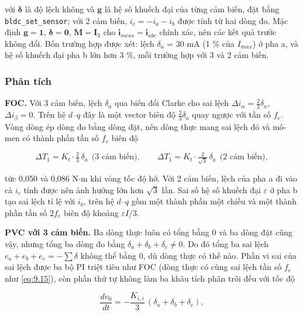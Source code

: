 với $\boldsymbol{\delta}$ là độ lệch không và $\mathbf{g}$ là hệ số khuếch đại của từng cảm biến, đặt bằng \texttt{bldc\_set\_sensor}; với 2 cảm biến, $i_c = -i_a - i_b$ được tính từ hai dòng đo. Mặc định $\mathbf{g} = \mathbf{1}$, $\boldsymbol{\delta} = \mathbf{0}$, $\mathbf{M} = \mathbf{I}_3$ cho $\mathbf{i}_{meas} = \mathbf{i}_{abc}$ chính xác, nên các kết quả trước không đổi. Bốn trường hợp được xét: lệch $\delta_a$ = 30 mA (1 \% của $I_{max}$) ở pha a, và hệ số khuếch đại pha b lớn hơn 3 \%, mỗi trường hợp với 3 và 2 cảm biến.

\subsubsection{Phân tích}\label{sec:9.9.2}

\textbf{FOC.} Với 3 cảm biến, lệch $\delta_a$ qua biến đổi Clarke cho sai lệch $\Delta i_\alpha = \tfrac23\delta_a$, $\Delta i_\beta = 0$. Trên hệ $d$–$q$ đây là một vector biên độ $\tfrac23\delta_a$ quay ngược với tần số $f_e$. Vòng dòng ép dòng đo bằng dòng đặt, nên dòng thực mang sai lệch đó và mô-men có thành phần tần số $f_e$ biên độ

\begin{equation}
\Delta T_1 = K_t \cdot \tfrac{2}{3}\,\delta_a\ \ \text{(3 cảm biến)}, \qquad \Delta T_1 = K_t \cdot \tfrac{2}{\sqrt3}\,\delta_a\ \ \text{(2 cảm biến)},
\tag{9.15}\label{eq:9.15}
\end{equation}

tức 0,050 và 0,086 N$\cdot$m khi vòng tốc độ hở. Với 2 cảm biến, lệch của pha a đi vào cả $i_c$ tính được nên ảnh hưởng lớn hơn $\sqrt3$ lần. Sai số hệ số khuếch đại $\varepsilon$ ở pha b tạo sai lệch tỉ lệ với $i_b$, trên hệ $d$–$q$ gồm một thành phần một chiều và một thành phần tần số $2f_e$ biên độ khoảng $\varepsilon I/3$.

\textbf{PVC với 3 cảm biến.} Ba dòng thực luôn có tổng bằng 0 và ba dòng đặt cũng vậy, nhưng tổng ba dòng đo bằng $\delta_a + \delta_b + \delta_c \neq 0$. Do đó tổng ba sai lệch $e_a + e_b + e_c = -\sum\delta$ không thể bằng 0, dù dòng thực có thế nào. Phần vi sai của sai lệch được ba bộ PI triệt tiêu như FOC (dòng thực có cùng sai lệch tần số $f_e$ như \eqref{eq:9.15}), còn phần thứ tự không làm ba khâu tích phân trôi đều với tốc độ

\begin{equation}
\frac{dv_0}{dt} = -\frac{K_{i,i}}{3}\,(\delta_a + \delta_b + \delta_c),
\tag{9.16}\label{eq:9.16}
\end{equation}

